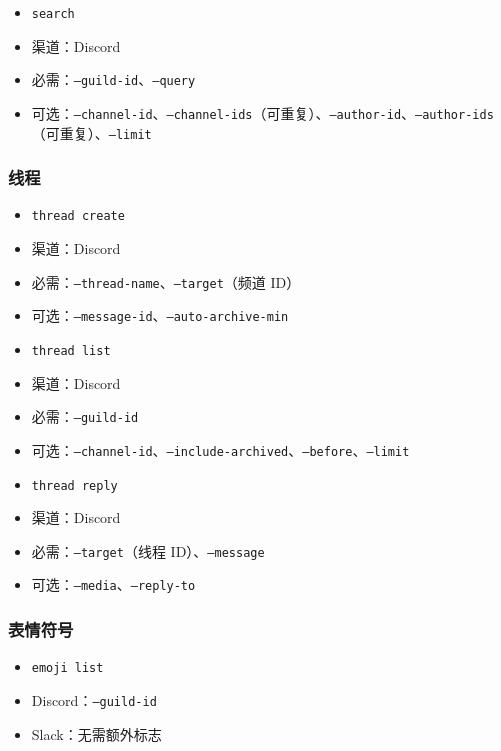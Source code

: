 \begin{itemize}
  \item \texttt{search}
  \item 渠道：Discord
  \item 必需：\texttt{--guild-id}、\texttt{--query}
  \item 可选：\texttt{--channel-id}、\texttt{--channel-ids}（可重复）、\texttt{--author-id}、\texttt{--author-ids}（可重复）、\texttt{--limit}
\end{itemize}


\subsubsection{线程}


\begin{itemize}
  \item \texttt{thread create}
  \item 渠道：Discord
  \item 必需：\texttt{--thread-name}、\texttt{--target}（频道 ID）
  \item 可选：\texttt{--message-id}、\texttt{--auto-archive-min}
\end{itemize}


\begin{itemize}
  \item \texttt{thread list}
  \item 渠道：Discord
  \item 必需：\texttt{--guild-id}
  \item 可选：\texttt{--channel-id}、\texttt{--include-archived}、\texttt{--before}、\texttt{--limit}
\end{itemize}


\begin{itemize}
  \item \texttt{thread reply}
  \item 渠道：Discord
  \item 必需：\texttt{--target}（线程 ID）、\texttt{--message}
  \item 可选：\texttt{--media}、\texttt{--reply-to}
\end{itemize}


\subsubsection{表情符号}


\begin{itemize}
  \item \texttt{emoji list}
  \item Discord：\texttt{--guild-id}
  \item Slack：无需额外标志
\end{itemize}



